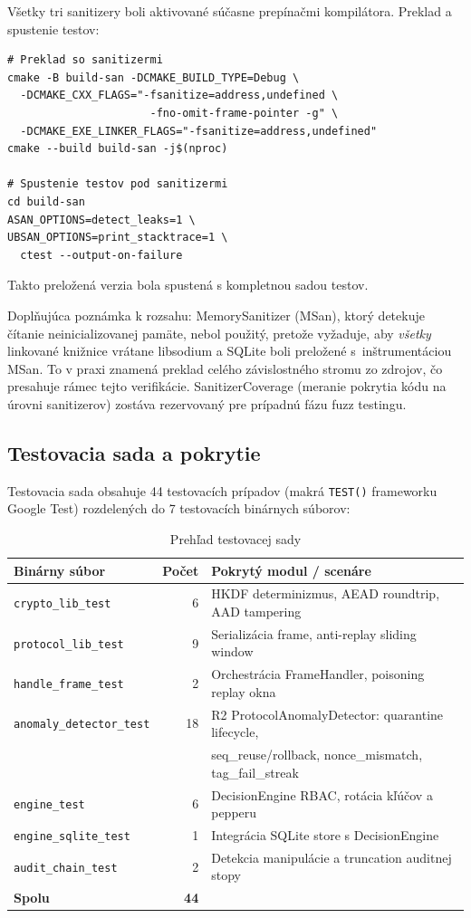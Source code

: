 \documentclass[journal,a4paper,onecolumn]{IEEEtran}
\begin{document}
Všetky tri sanitizery boli aktivované súčasne prepínačmi kompilátora. Preklad a spustenie testov:

\begin{verbatim}
# Preklad so sanitizermi
cmake -B build-san -DCMAKE_BUILD_TYPE=Debug \
  -DCMAKE_CXX_FLAGS="-fsanitize=address,undefined \
                      -fno-omit-frame-pointer -g" \
  -DCMAKE_EXE_LINKER_FLAGS="-fsanitize=address,undefined"
cmake --build build-san -j$(nproc)

# Spustenie testov pod sanitizermi
cd build-san
ASAN_OPTIONS=detect_leaks=1 \
UBSAN_OPTIONS=print_stacktrace=1 \
  ctest --output-on-failure
\end{verbatim}

\noindent Takto preložená verzia bola spustená s kompletnou sadou testov.

Doplňujúca poznámka k rozsahu: MemorySanitizer (MSan), ktorý detekuje čítanie neinicializovanej pamäte, nebol použitý, pretože vyžaduje, aby \emph{všetky} linkované knižnice vrátane libsodium a SQLite boli preložené s~inštrumentáciou MSan. To v praxi znamená preklad celého závislostného stromu zo zdrojov, čo presahuje rámec tejto verifikácie. SanitizerCoverage (meranie pokrytia kódu na úrovni sanitizerov) zostáva rezervovaný pre prípadnú fázu fuzz testingu.

\subsection{Testovacia sada a pokrytie}

Testovacia sada obsahuje 44 testovacích prípadov (makrá \texttt{TEST()} frameworku Google Test\cite{GoogleTest}) rozdelených do 7 testovacích binárnych súborov:

\begin{table}[h]
\renewcommand{\arraystretch}{1.3}
\centering
\caption{Prehľad testovacej sady}
\label{tab:test-suite}
\begin{tabular}{lrl}
\hline
\textbf{Binárny súbor} & \textbf{Počet} & \textbf{Pokrytý modul / scenáre} \\
\hline
\texttt{crypto\_lib\_test} & 6 & HKDF determinizmus, AEAD roundtrip, AAD tampering \\
\texttt{protocol\_lib\_test} & 9 & Serializácia frame, anti-replay sliding window \\
\texttt{handle\_frame\_test} & 2 & Orchestrácia FrameHandler, poisoning replay okna \\
\texttt{anomaly\_detector\_test} & 18 & R2 ProtocolAnomalyDetector: quarantine lifecycle, \\
 & & seq\_reuse/rollback, nonce\_mismatch, tag\_fail\_streak \\
\texttt{engine\_test} & 6 & DecisionEngine RBAC, rotácia kľúčov a pepperu \\
\texttt{engine\_sqlite\_test} & 1 & Integrácia SQLite store s DecisionEngine \\
\texttt{audit\_chain\_test} & 2 & Detekcia manipulácie a truncation auditnej stopy \\
\hline
\textbf{Spolu} & \textbf{44} & \\
\hline
\end{tabular}
\end{table}
\end{document}
